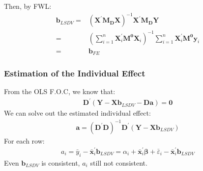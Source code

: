 \documentclass{article}
\begin{document}
Then, by FWL:
	\begin{align*}
		\boldsymbol{b}_{LSDV} = &(\boldsymbol{X}^\prime \boldsymbol{M_D} \boldsymbol{X})^{-1} \boldsymbol{X}^\prime \boldsymbol{M_D} \boldsymbol{Y}\\ = &
		\left( \sum^n_{i=1} \boldsymbol{X}^\prime_i \boldsymbol{M^0} \boldsymbol{X}_i \right)^{-1} \sum^n_{i=1} \boldsymbol{X}^\prime_i \boldsymbol{M^0} \boldsymbol{y}_i \\ = &
		\boldsymbol{b}_{FE}
	\end{align*}

\subsubsection{Estimation of the Individual Effect}
From the OLS F.O.C, we know that:
	\begin{align*}
		\boldsymbol{D}^\prime (\boldsymbol{Y} - \boldsymbol{X} \boldsymbol{b}_{LSDV} - \boldsymbol{D}\boldsymbol{a}) = \boldsymbol{0}
	\end{align*}
We can solve out the estimated individual effect:
	\begin{align*}
		\boldsymbol{a} = (\boldsymbol{D}^\prime \boldsymbol{D})^{-1} \boldsymbol{D}^\prime (\boldsymbol{Y} - \boldsymbol{X}\boldsymbol{b}_{LSDV})
	\end{align*}
For each row:
	\begin{align*}
		a_i = \bar{y}_i - \bar{\boldsymbol{x}}^\prime_i \boldsymbol{b}_{LSDV} = \alpha_i + \bar{\boldsymbol{x}}^\prime_i \boldsymbol{\beta} + \bar{\varepsilon}_i - \bar{\boldsymbol{x}}^\prime_i \boldsymbol{b}_{LSDV}
	\end{align*}
Even $\boldsymbol{b}_{LSDV}$ is consistent, $a_i$ still not consistent.
\end{document}
